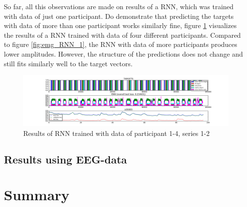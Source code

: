 \documentclass{article} %
\begin{document}
So far, all this observations are made on results of a RNN, which was trained with data of just one participant. Do demonstrate that predicting the targets with data of more than one participant works similarly fine, figure \ref{fig:emg_RNN_2} visualizes the results of a RNN trained with data of four different participants. Compared to figure \ref{fig:emg_RNN_1}, the RNN with data of more participants produces lower amplitudes. However, the structure of the predictions does not change and still fits similarly well to the target vectors.
\begin{figure}
	\centering
	\includegraphics[width=1.0\textwidth]{images/EMG-results_participant_1-4_series1-2.png}
	\caption{Results of RNN trained with data of participant 1-4, series 1-2}
	\label{fig:emg_RNN_2}
\end{figure}

\subsection{Results using EEG-data}

\section{Summary}
\end{document}
